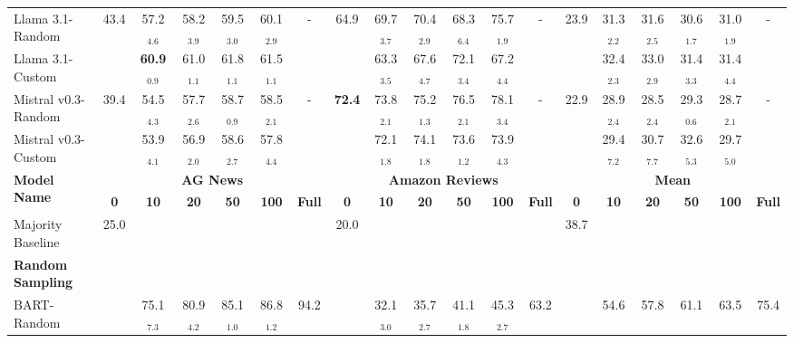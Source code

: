 \documentclass[11pt]{article}
\theoremstyle{definition}
\begin{document}
\begin{table*}[hbt]
{\begin{tabular}{l|cccccc|cccccc|cccccc}
\hdashline[1pt/4pt]

Llama 3.1-Random &
43.4 & 57.2$_{4.6}$ & 58.2$_{3.9}$ & 59.5$_{3.0}$ & 60.1$_{2.9}$ & - &
64.9 & 69.7$_{3.7}$ & 70.4$_{2.9}$ & 68.3$_{6.4}$ & 75.7$_{1.9}$ & - &
23.9 & 31.3$_{2.2}$ & 31.6$_{2.5}$ & 30.6$_{1.7}$ & 31.0$_{1.9}$ & - \\

Llama 3.1-Custom &
& \textbf{60.9}$_{0.9}$ & 61.0$_{1.1}$ & 61.8$_{1.1}$ & 61.5$_{1.1}$ & &
& 63.3$_{3.5}$ & 67.6$_{4.7}$ & 72.1$_{3.4}$ & 67.2$_{4.4}$ & &
& 32.4$_{2.3}$ & 33.0$_{2.9}$ & 31.4$_{3.3}$ & 31.4$_{4.4}$ & \\

\hdashline[1pt/4pt]

Mistral v0.3-Random &
39.4 & 54.5$_{4.3}$ & 57.7$_{2.6}$ & 58.7$_{0.9}$ & 58.5$_{2.1}$ & - &
\textbf{72.4} & 73.8$_{2.1}$ & 75.2$_{1.3}$ & 76.5$_{2.1}$ & 78.1$_{3.4}$ & - &
22.9 & 28.9$_{2.4}$ & 28.5$_{2.4}$ & 29.3$_{0.6}$ & 28.7$_{2.1}$ & - \\

Mistral v0.3-Custom &
& 53.9$_{4.1}$ & 56.9$_{2.0}$ & 58.6$_{2.7}$ & 57.8$_{4.4}$ & &
& 72.1$_{1.8}$ & 74.1$_{1.8}$ & 73.6$_{1.2}$ & 73.9$_{4.3}$ & &
& 29.4$_{7.2}$ & 30.7$_{7.7}$ & 32.6$_{5.3}$ & 29.7$_{5.0}$ & \\

\hline
\hline

\multirow{2}{*}{\textbf{Model Name}} &
\multicolumn{6}{c|}{\textbf{AG News}} &
\multicolumn{6}{c|}{\textbf{Amazon Reviews}} &
\multicolumn{6}{c}{\textbf{Mean}} \\

&
\textbf{0} & \textbf{10} & \textbf{20} & \textbf{50} & \textbf{100} & \textbf{Full} &
\textbf{0} & \textbf{10} & \textbf{20} & \textbf{50} & \textbf{100} & \textbf{Full} &
\textbf{0} & \textbf{10} & \textbf{20} & \textbf{50} & \textbf{100} & \textbf{Full} \\

\hline

Majority Baseline &
25.0 & & & & & &
20.0 & & & & & &
38.7 & & & & & \\

\hdashline

\textbf{Random Sampling} &
& & & & & &
& & & & & &
& & & & & \\

BART-Random &
& 75.1$_{7.3}$ & 80.9$_{4.2}$ & 85.1$_{1.0}$ & 86.8$_{1.2}$ & 94.2 &
& 32.1$_{3.0}$ & 35.7$_{2.7}$ & 41.1$_{1.8}$ & 45.3$_{2.7}$ & 63.2 &
& 54.6 & 57.8 & 61.1 & 63.5 & 75.4 \\


\end{tabular}}
\end{table*}
\end{document}
